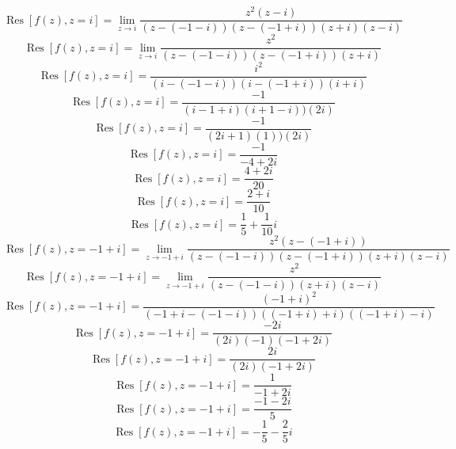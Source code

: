 \documentclass[12pt]{article}
\newcommand{\Res}{\operatorname{Res}}
\begin{document}
\begin{equation}
	\Res[f(z), z=i]=\lim_{z\to i}\frac{z^2(z-i)}{(z-(-1-i))(z-(-1+i))(z+i)(z-i)}
\end{equation}
\begin{equation}
	\Res[f(z), z=i]=\lim_{z\to i}\frac{z^2}{(z-(-1-i))(z-(-1+i))(z+i)}
\end{equation}
\begin{equation}
	\Res[f(z), z=i]=\frac{i^2}{(i-(-1-i))(i-(-1+i))(i+i)}
\end{equation}
\begin{equation}
	\Res[f(z), z=i]=\frac{-1}{(i-1+i)(i+1-i))(2i)}
\end{equation}
\begin{equation}
	\Res[f(z), z=i]=\frac{-1}{(2i+1)(1))(2i)}
\end{equation}
\begin{equation}
	\Res[f(z), z=i]=\frac{-1}{-4+2i}
\end{equation}
\begin{equation}
	\Res[f(z), z=i]=\frac{4+2i}{20}
\end{equation}
\begin{equation}
	\Res[f(z), z=i]=\frac{2+i}{10}
\end{equation}
\begin{equation}
	\Res[f(z), z=i]=\frac{1}{5}+\frac{1}{10}i
\end{equation}
\begin{equation}
	\Res[f(z), z=-1+i]=\lim_{z\to -1+i}\frac{z^2(z-(-1+i))}{(z-(-1-i))(z-(-1+i))(z+i)(z-i)}
\end{equation}
\begin{equation}
	\Res[f(z), z=-1+i]=\lim_{z\to -1+i}\frac{z^2}{(z-(-1-i))(z+i)(z-i)}
\end{equation}
\begin{equation}
	\Res[f(z), z=-1+i]=\frac{(-1+i)^2}{(-1+i-(-1-i))((-1+i)+i)((-1+i)-i)}
\end{equation}
\begin{equation}
	\Res[f(z), z=-1+i]=\frac{-2i}{(2i)(-1)(-1+2i)}
\end{equation}
\begin{equation}
	\Res[f(z), z=-1+i]=\frac{2i}{(2i)(-1+2i)}
\end{equation}
\begin{equation}
	\Res[f(z), z=-1+i]=\frac{1}{-1+2i}
\end{equation}
\begin{equation}
	\Res[f(z), z=-1+i]=\frac{-1-2i}{5}
\end{equation}
\begin{equation}
	\Res[f(z), z=-1+i]=-\frac{1}{5}-\frac{2}{5}i
\end{equation}
\end{document}
